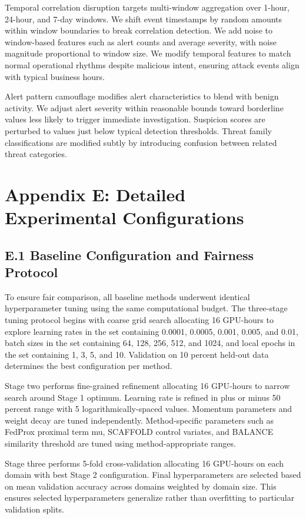 \documentclass[12pt,a4paper]{article}
\theoremstyle{definition}
\begin{document}
Temporal correlation disruption targets multi-window aggregation over 1-hour, 24-hour, and 7-day windows. We shift event timestamps by random amounts within window boundaries to break correlation detection. We add noise to window-based features such as alert counts and average severity, with noise magnitude proportional to window size. We modify temporal features to match normal operational rhythms despite malicious intent, ensuring attack events align with typical business hours.

Alert pattern camouflage modifies alert characteristics to blend with benign activity. We adjust alert severity within reasonable bounds toward borderline values less likely to trigger immediate investigation. Suspicion scores are perturbed to values just below typical detection thresholds. Threat family classifications are modified subtly by introducing confusion between related threat categories.

\section{Appendix E: Detailed Experimental Configurations}

\subsection{E.1 Baseline Configuration and Fairness Protocol}

To ensure fair comparison, all baseline methods underwent identical hyperparameter tuning using the same computational budget. The three-stage tuning protocol begins with coarse grid search allocating 16 GPU-hours to explore learning rates in the set containing 0.0001, 0.0005, 0.001, 0.005, and 0.01, batch sizes in the set containing 64, 128, 256, 512, and 1024, and local epochs in the set containing 1, 3, 5, and 10. Validation on 10 percent held-out data determines the best configuration per method.

Stage two performs fine-grained refinement allocating 16 GPU-hours to narrow search around Stage 1 optimum. Learning rate is refined in plus or minus 50 percent range with 5 logarithmically-spaced values. Momentum parameters and weight decay are tuned independently. Method-specific parameters such as FedProx proximal term mu, SCAFFOLD control variates, and BALANCE similarity threshold are tuned using method-appropriate ranges.

Stage three performs 5-fold cross-validation allocating 16 GPU-hours on each domain with best Stage 2 configuration. Final hyperparameters are selected based on mean validation accuracy across domains weighted by domain size. This ensures selected hyperparameters generalize rather than overfitting to particular validation splits.
\end{document}

